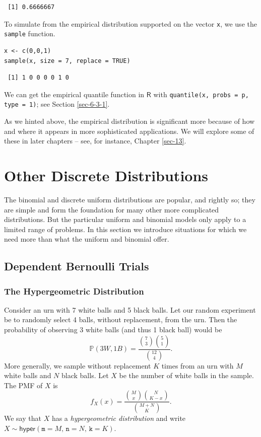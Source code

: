 \documentclass[captions=tableheading]{scrbook}
\begin{document}
\begin{verbatim}
 [1] 0.6666667
\end{verbatim}

To simulate from the empirical distribution supported on the vector \texttt{x}, we use the \texttt{sample} function.


\lstset{language=R}
\begin{lstlisting}
x <- c(0,0,1)
sample(x, size = 7, replace = TRUE)
\end{lstlisting}

\begin{verbatim}
 [1] 1 0 0 0 0 1 0
\end{verbatim}

We can get the empirical quantile function in \(\mathsf{R}\) with \texttt{quantile(x, probs = p, type = 1)}; see Section \ref{sec-6-3-1}.

As we hinted above, the empirical distribution is significant more because of how and where it appears in more sophisticated applications. We will explore some of these in later chapters -- see, for instance, Chapter \ref{sec-13}.
\section{Other Discrete Distributions}
\label{sec-5-6}
\label{sec-other-discrete-distributions}


The binomial and discrete uniform distributions are popular, and rightly so; they are simple and form the foundation for many other more complicated distributions. But the particular uniform and binomial models only apply to a limited range of problems. In this section we introduce situations for which we need more than what the uniform and binomial offer.
\subsection{Dependent Bernoulli Trials}
\label{sec-5-6-1}
\label{sec-non-bernoulli-trials}
\subsubsection{The Hypergeometric Distribution}
\label{sec-5-6-1-1}
\label{sub-hypergeometric-dist}


Consider an urn with 7 white balls and 5 black balls. Let our random experiment be to randomly select 4 balls, without replacement, from the urn. Then the probability of observing 3 white balls (and thus 1 black ball) would be
\begin{equation}
\mathbb{P}(3W,1B)=\frac{{7 \choose 3}{5 \choose 1}}{{12 \choose 4}}.
\end{equation}
More generally, we sample without replacement \(K\) times from an urn with \(M\) white balls and \(N\) black balls. Let \(X\) be the number of white balls in the sample. The PMF of \(X\) is
\begin{equation}
f_{X}(x)=\frac{{M \choose x}{N \choose K-x}}{{M+N \choose K}}.
\end{equation}
We say that \(X\) has a \emph{hypergeometric distribution} and write \(X\sim\mathsf{hyper}(\mathtt{m}=M,\,\mathtt{n}=N,\,\mathtt{k}=K)\).
\end{document}
